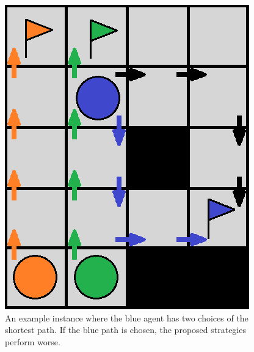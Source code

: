 \begin{figure}[ht]
\centering
\includegraphics[width=0.3\columnwidth]{img/p_counterexample.png}
\caption{An example instance where the blue agent has two choices of the shortest path. If the blue path is chosen, the proposed strategies perform worse.}
\label{fig:p_counterexample}
\end{figure}





